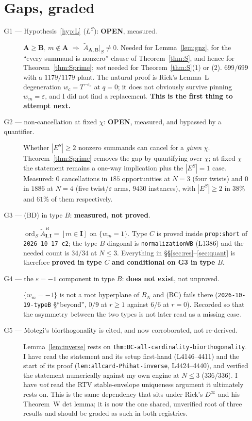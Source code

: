 \documentclass[11pt]{article}
\theoremstyle{definition}
\newcommand{\At}{\widetilde{A}}
\newcommand{\bI}{\mathbf{I}}
\newcommand{\bA}{\mathbf{A}}
\newcommand{\bB}{\mathbf{B}}
\newcommand{\ord}{\operatorname{ord}}
\newcommand{\ES}{E^{S}}
\begin{document}
\section{Gaps, graded}
\label{sec:gaps}

\begin{description}
\item[G1 --- Hypothesis~\ref{hyp:L} ($L^{S}$): \textbf{OPEN}, measured.]
  $\bA\ge\bB$, $m\notin\bA$ $\Rightarrow$ $\At_{\bA,\bB}|_{S}\ne0$.  Needed for
  Lemma~\ref{lem:gnz}, for the ``every summand is nonzero'' clause of
  Theorem~\ref{thm:S}, and hence for Theorem~\ref{thm:Sprime}; \emph{not} needed
  for Theorem~\ref{thm:S}(1) or (2).  $699/699$ with a $1179/1179$ plant.  The
  natural proof is Rick's Lemma~L degeneration $w_c=T^{-e_c}$ at $q=0$; it does
  not obviously survive pinning $w_m=\varepsilon$, and I did not find a
  replacement.  \textbf{This is the first thing to attempt next.}
\item[G2 --- non-cancellation at fixed $\chi$: \textbf{OPEN}, measured, and
  bypassed by a quantifier.]  Whether $|\ES|\ge2$ nonzero summands can cancel for
  a \emph{given} $\chi$.  Theorem~\ref{thm:Sprime} removes the gap by quantifying
  over $\chi$; at fixed $\chi$ the statement remains a one-way implication plus
  the $|\ES|=1$ case.  Measured: $0$ cancellations in $185$ opportunities at $N=3$ (four twists) and
  $0$ in $1886$ at $N=4$ (five twist/$\varepsilon$ arms, $9430$ instances), with
  $|\ES|\ge2$ in $38\%$ and $61\%$ of them respectively.
\item[G3 --- (BD) in type $B$: \textbf{measured, not proved}.]
  $\ord_S\At^{B}_{\bI,\bI}=[m\in\bI]$ on $\{w_m=1\}$.  Type $C$ is proved inside
  \texttt{prop:short} of \texttt{2026-10-17-c2}; the type-$B$ diagonal is
  \texttt{normalizationWB} (L1386) and the needed count is $34/34$ at $N\le3$.
  Everything in \S\S\ref{sec:res}--\ref{sec:quant} is therefore
  \textbf{proved in type $C$ and conditional on G3 in type $B$}.
\item[G4 --- the $\varepsilon=-1$ component in type $B$: \textbf{does not exist},
  not unproved.]  $\{w_m=-1\}$ is not a root hyperplane of $B_N$ and (BC) fails
  there (\texttt{2026-10-19-typeB} \S``beyond'', $0/9$ at $r\ge1$ against $6/6$
  at $r=0$).  Recorded so that the asymmetry between the two types is not later
  read as a missing case.
\item[G5 --- Motegi's biorthogonality is cited, and now corroborated, not
  re-derived.]  Lemma~\ref{lem:inverse} rests on
  \texttt{thm:BC-all-cardinality-biorthogonality}.  I have read the statement and
  its setup first-hand (L4146--4411) and the start of its proof
  (\texttt{lem:allcard-Phihat-inverse}, L4424--4440), and verified the statement
  numerically against my own engine at $N\le3$ ($336/336$).  I have \emph{not}
  read the RTV stable-envelope uniqueness argument it ultimately rests on.  This
  is the same dependency that sits under Rick's $D^\infty$ and his Theorem~W det
  lemma; it is now the one shared, unverified root of three results and should be
  graded as such in both registries.
\end{description}
\end{document}
